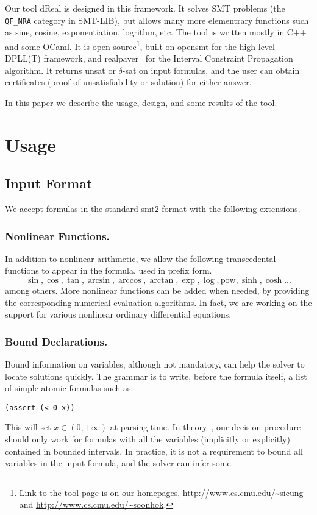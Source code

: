 \documentclass[envcountsect]{llncs}
\begin{document}
Our tool {\sf dReal} is designed in this framework. It solves SMT problems
(the {\tt QF\_NRA} category in SMT-LIB), but allows many more elementrary
functions such as sine, cosine, exponentiation, logrithm, etc. The tool is
written mostly in C++ and some OCaml. It is open-source\footnote{Link to the
tool page is on our homepages, \url{http://www.cs.cmu.edu/~sicung} and
\url{http://www.cs.cmu.edu/~soonhok}.
}, built on {\sf opensmt}\cite{DBLP:conf/tacas/BruttomessoPST10} for the
high-level DPLL(T) framework, and {\sf
realpaver}~\cite{DBLP:journals/toms/GranvilliersB06} for the Interval
Constraint Propagation algorithm. It returns {\sf unsat} or {\sf $\delta$-sat}
on input formulas, and the user can obtain certificates (proof of
unsatisfiability or solution) for either answer.

In this paper we describe the usage, design, and some results of the tool. 

\section{Usage}

\subsection{Input Format}

We accept formulas in the standard {\sf smt2} format with the following
extensions.

\subsubsection{Nonlinear Functions.} In addition to nonlinear arithmetic, we
allow the following transcedental functions to appear in the formula, used in
prefix form.
 $$\sin, \cos, \tan, \arcsin, \arccos, \arctan, \exp, \log, \mbox{pow}, \sinh,
\cosh ... $$
among others. More nonlinear functions can be added when needed, by providing
the corresponding numerical evaluation algorithms. In fact, we are working on
the support for various nonlinear ordinary differential equations.

\subsubsection{Bound Declarations.} Bound information on variables, although not
mandatory, can help the solver to locate solutions quickly. The grammar is to
write, before the formula itself, a list of simple atomic formulas such as:
\begin{verbatim}
(assert (< 0 x))
\end{verbatim}
This will set $x\in (0, +\infty)$ at parsing time. In theory~\cite{}, our
decision procedure should only work for formulas with all the variables
(implicitly or explicitly) contained in bounded intervals. In practice, it is
not a requirement to bound all variables in the input formula, and the solver
can infer some.
\end{document}
